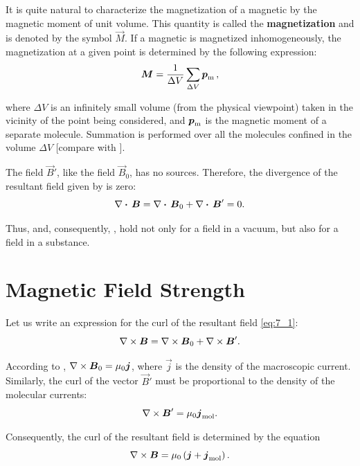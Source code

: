 It is quite natural to characterize the magnetization of a magnetic by the magnetic moment of unit volume.
This quantity is called the \textbf{magnetization} and is denoted by the symbol $\vec{M}$.
If a magnetic
is magnetized inhomogeneously, the magnetization at a given point is determined by the following expression:
\begin{equation}\label{eq:7_2}
    \boldsymbol{M} = \frac{1}{\Delta{V}} \sum_{\Delta{V}} \boldsymbol{p}_{\text{m}}\,,
\end{equation}

\noindent
where $\Delta{V}$ is an infinitely small volume (from the physical viewpoint) taken in the vicinity of the point being considered, and $\boldsymbol{p}_{\text{m}}$ is the magnetic moment of a separate molecule.
Summation is performed over all the molecules confined in the volume $\Delta{V}$ [compare with ].

The field $\vec{B}'$, like the field $\vec{B}_0$, has no sources.
Therefore, the divergence of the resultant field given by  is zero:
\begin{equation}\label{eq:7_3}
    \nabla\boldsymbol{\cdot}\,\boldsymbol{B} = \nabla\boldsymbol{\cdot}\,\boldsymbol{B}_0 + \nabla\boldsymbol{\cdot}\,\boldsymbol{B}' = 0.
\end{equation}

\noindent
Thus,  and, consequently, , hold not only for a field in a vacuum, but also for a field in a substance.

\section{Magnetic Field Strength}\label{sec:7_2}

Let us write an expression for the curl of the resultant field \eqref{eq:7_1}:
\begin{equation*}
    \nabla\times\boldsymbol{B} = \nabla\times\boldsymbol{B}_0 + \nabla\times\boldsymbol{B}'.
\end{equation*}

\noindent
According to , $\nabla\times\boldsymbol{B}_0=\mu_0\boldsymbol{j}$, where $\vec{j}$ is the density of the macroscopic current.
Similarly, the curl of the vector $\vec{B}'$ must be proportional to the density of the molecular currents:
\begin{equation*}
    \nabla\times\boldsymbol{B}' = \mu_0 \boldsymbol{j}_{\text{mol}}.
\end{equation*}

\noindent
Consequently, the curl of the resultant field is determined by the equation
\begin{equation}\label{eq:7_4}
    \nabla\times\boldsymbol{B} = \mu_0 \left(\boldsymbol{j} + \boldsymbol{j}_{\text{mol}}\right).
\end{equation}

